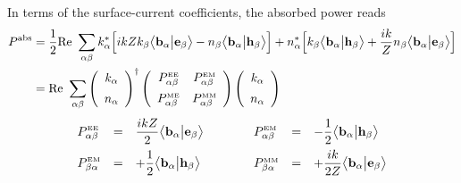 In terms of the surface-current coefficients, the absorbed power
reads 
\begin{align*}
 P^{\hbox{\scriptsize{abs}}} 
&= \frac{1}{2}\text{Re }\sum_{\alpha\beta}
   k^*_\alpha \Big[  ikZ  k_\beta\big\langle \mathbf{b}_\alpha \big| \mathbf{e}_\beta \big\rangle
                         -n_\beta\big\langle \mathbf{b}_\alpha \big| \mathbf{h}_\beta \big\rangle
              \Big]
+
   n^*_\alpha \Big[   k_\beta\big\langle \mathbf{b}_\alpha \big| \mathbf{h}_\beta \big\rangle
                    + \frac{ik}{Z} n_\beta\big\langle \mathbf{b}_\alpha \big| \mathbf{e}_\beta \big\rangle
              \Big]
\\
 &= \text{Re }\sum_{\alpha\beta}
    \left(
     \begin{array}{c}
      k_\alpha \\[5pt]
      n_\alpha
     \end{array}
    \right) ^\dagger
    \left(\begin{array}{cc}
     P^{\hbox{\tiny{EE}}}_{\alpha\beta} & 
     P^{\hbox{\tiny{EM}}}_{\alpha\beta} \\[5pt]
     P^{\hbox{\tiny{ME}}}_{\alpha\beta} &
     P^{\hbox{\tiny{MM}}}_{\alpha\beta}
     \end{array}
    \right)
    \left(
     \begin{array}{c}
      k_\alpha \\[5pt]
      n_\alpha
     \end{array}
    \right)
\end{align*}
$$\begin{array}{lclclcl}
 \displaystyle{
 P^{\hbox{\tiny{EE}}}_{\alpha\beta}
              }
 &=&
 \displaystyle{
 \frac{ikZ}{2}  \big\langle \mathbf{b}_\alpha \big| \mathbf{e}_\beta \big\rangle
              }
 &\qquad&
 \displaystyle{
 P^{\hbox{\tiny{EM}}}_{\alpha\beta}
              }
 &=&
 \displaystyle{
 -\frac{1}{2} \big\langle \mathbf{b}_\alpha \big| \mathbf{h}_\beta \big\rangle
              }
\\[8pt]
 \displaystyle{
 P^{\hbox{\tiny{EM}}}_{\beta\alpha}
              }
 &=&
 \displaystyle{
 +\frac{1}{2} \big\langle \mathbf{b}_\alpha \big| \mathbf{h}_\beta \big\rangle
              }
 &\quad& 
 P^{\hbox{\tiny{MM}}}_{\beta\alpha}
 &=&
 \displaystyle{
 +\frac{ik}{2Z} \big\langle \mathbf{b}_\alpha \big| \mathbf{e}_\beta \big\rangle
              }
\end{array}$$
